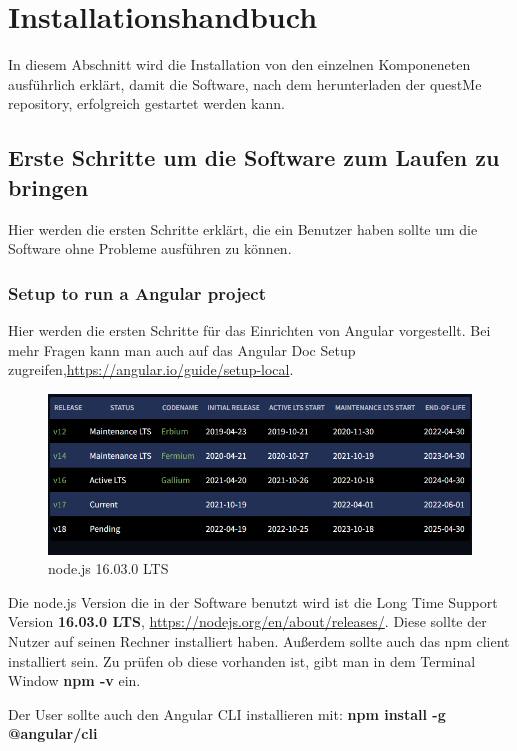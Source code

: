 \section{Installationshandbuch}
In diesem Abschnitt wird die Installation von den einzelnen Komponeneten
ausführlich erklärt, damit die Software, nach dem herunterladen der questMe repository, erfolgreich gestartet werden kann.

\subsection{Erste Schritte um die Software zum Laufen zu bringen}
Hier werden die ersten Schritte erklärt, die ein Benutzer haben sollte um die
Software ohne Probleme ausführen zu können.

\subsubsection{Setup to run a Angular project}
Hier werden die ersten Schritte für das Einrichten von Angular vorgestellt.
Bei mehr Fragen kann man auch auf das Angular Doc Setup zugreifen,\href{https://angular.io/guide/setup-local}{https://angular.io/guide/setup-local}.
\begin{figure}[H]
    \centering
    \includegraphics[width=1.0\textwidth]{bilder/installationshandbuch/node.js_version_16.13.0_LTS.PNG}
    \caption{node.js 16.03.0 LTS}
    \label{fig:node.js_16.03.0_LTS}
\end{figure}
\noindent Die node.js Version die in der Software benutzt wird ist die Long Time Support Version \textbf{16.03.0 LTS}, \href{https://nodejs.org/en/about/releases/}{https://nodejs.org/en/about/releases/}.
Diese sollte der Nutzer auf seinen Rechner installiert haben.
Außerdem sollte auch das npm client installiert sein. Zu prüfen ob diese vorhanden ist,
gibt man in dem Terminal Window \textbf{npm -v} ein.\newline

\noindent Der User sollte auch den Angular CLI installieren mit: 
\textbf{npm install -g @angular/cli}

